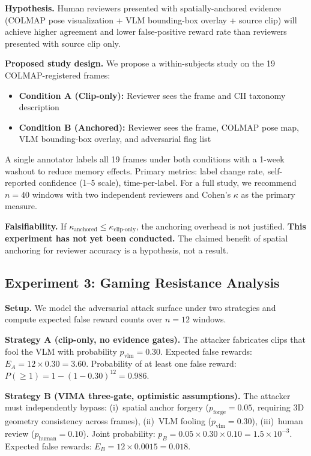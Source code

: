 \documentclass[sigconf,nonacm]{acmart}
\begin{document}
\textbf{Hypothesis.}
Human reviewers presented with spatially-anchored evidence (COLMAP pose visualization + VLM bounding-box overlay + source clip) will achieve higher agreement and lower false-positive reward rate than reviewers presented with source clip only.

\textbf{Proposed study design.}
We propose a within-subjects study on the 19 COLMAP-registered frames:
\begin{itemize}[leftmargin=1.4em,itemsep=0.1em]
\item \textbf{Condition A (Clip-only):} Reviewer sees the frame and CII taxonomy description
\item \textbf{Condition B (Anchored):} Reviewer sees the frame, COLMAP pose map, VLM bounding-box overlay, and adversarial flag list
\end{itemize}
A single annotator labels all 19 frames under both conditions with a 1-week washout to reduce memory effects.
Primary metrics: label change rate, self-reported confidence (1--5 scale), time-per-label.
For a full study, we recommend $n = 40$ windows with two independent reviewers and Cohen's $\kappa$ as the primary measure.

\textbf{Falsifiability.}
If $\kappa_{\text{anchored}} \leq \kappa_{\text{clip-only}}$, the anchoring overhead is not justified.
\textbf{This experiment has not yet been conducted.}
The claimed benefit of spatial anchoring for reviewer accuracy is a hypothesis, not a result.

\subsection{Experiment 3: Gaming Resistance Analysis}
\label{sec:exp3}

\textbf{Setup.}
We model the adversarial attack surface under two strategies and compute expected false reward counts over $n = 12$ windows.

\textbf{Strategy A (clip-only, no evidence gates).}
The attacker fabricates clips that fool the VLM with probability $p_{\text{vlm}} = 0.30$.
Expected false rewards: $E_A = 12 \times 0.30 = 3.60$.
Probability of at least one false reward: $P(\geq 1) = 1 - (1 - 0.30)^{12} = 0.986$.

\textbf{Strategy B (VIMA three-gate, optimistic assumptions).}
The attacker must independently bypass:
(i)~spatial anchor forgery ($p_{\text{forge}} = 0.05$, requiring 3D geometry consistency across frames),
(ii)~VLM fooling ($p_{\text{vlm}} = 0.30$),
(iii)~human review ($p_{\text{human}} = 0.10$).
Joint probability: $p_B = 0.05 \times 0.30 \times 0.10 = 1.5 \times 10^{-3}$.
Expected false rewards: $E_B = 12 \times 0.0015 = 0.018$.
\end{document}
